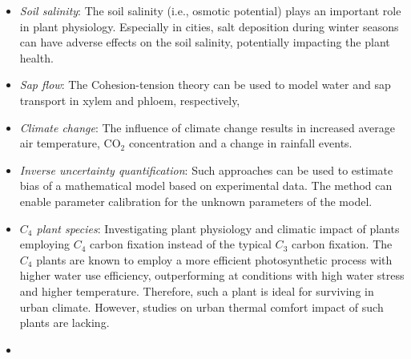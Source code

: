 \begin{itemize}
	\item \textit{Soil salinity}: The soil salinity (i.e., osmotic potential) plays an important role in plant physiology. Especially in cities, salt deposition during winter seasons can have adverse effects on the soil salinity, potentially impacting the plant health. 
	
	\item \textit{Sap flow}: The Cohesion-tension theory can be used to model water and sap transport in xylem and phloem, respectively,  
		
	\item \textit{Climate change}: The influence of climate change results in increased average air temperature, CO$_2$ concentration and a change in rainfall events. 
	
	\item \textit{Inverse uncertainty quantification}: Such approaches can be used to estimate bias of a mathematical model based on experimental data. The method can enable parameter calibration for the unknown parameters of the model.  
	
	\item \textit{$C_4$ plant species}:	Investigating plant physiology and climatic impact of plants employing $C_4$ carbon fixation instead of the typical $C_3$ carbon fixation. The $C_4$ plants are known to employ a more efficient photosynthetic process with higher water use efficiency, outperforming at conditions with high water stress and higher temperature. Therefore, such a plant is ideal for surviving in urban climate. However, studies on urban thermal comfort impact of such plants are lacking.
	
	\item {} 
	

\end{itemize}
